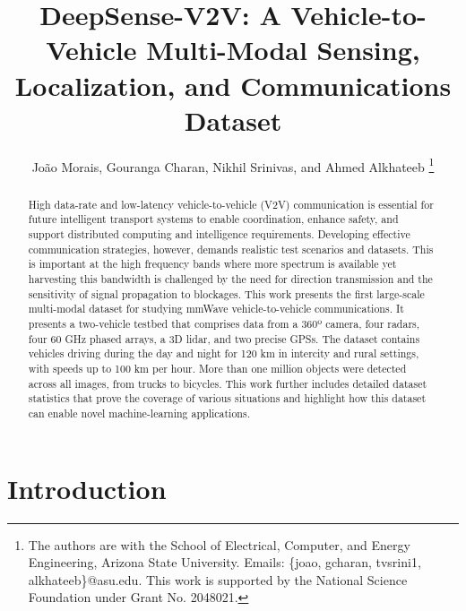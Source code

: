 \documentclass[10pt,comsoc]{IEEEtran}
\begin{document}
\title{DeepSense-V2V: A Vehicle-to-Vehicle Multi-Modal Sensing, Localization, and Communications Dataset}

\author{João Morais, Gouranga Charan, Nikhil Srinivas, and Ahmed Alkhateeb \thanks{The authors are with the School of Electrical, Computer, and Energy Engineering, Arizona State University. Emails: \{joao, gcharan, tvsrini1,  alkhateeb\}@asu.edu. This work is supported by the National Science Foundation under Grant No. 2048021.}}

\maketitle

\begin{abstract}
High data-rate and low-latency vehicle-to-vehicle (V2V) communication is essential for future intelligent transport systems to enable coordination, enhance safety, and support distributed computing and intelligence requirements. Developing effective communication strategies, however, demands realistic test scenarios and datasets. This is important at the high frequency bands where more spectrum is available yet harvesting this bandwidth is challenged by the need for direction transmission and the sensitivity of signal propagation to blockages. This work presents the first large-scale multi-modal dataset for studying mmWave vehicle-to-vehicle communications. It presents a two-vehicle testbed that comprises data from a 360º camera, four radars, four 60 GHz phased arrays, a 3D lidar, and two precise GPSs. The dataset contains vehicles driving during the day and night for 120 km in intercity and rural settings, with speeds up to 100 km per hour. More than one million objects were detected across all images, from trucks to bicycles. This work further includes detailed dataset statistics that prove the coverage of various situations and highlight how this dataset can enable novel machine-learning applications.
\end{abstract}

\vspace{-.02cm}

\section{Introduction} \label{sec:Intro}
\end{document}

